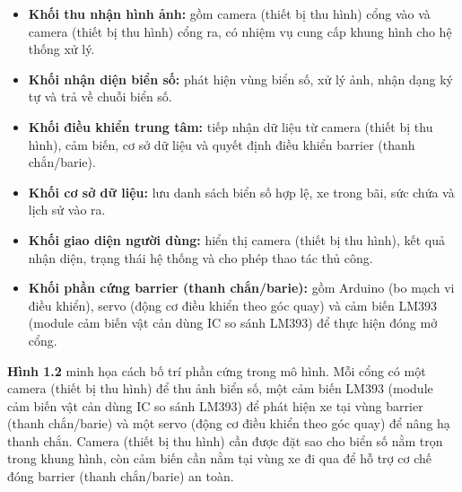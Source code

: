\documentclass[a4paper,14pt]{extreport}
\begin{document}
\begin{itemize}[leftmargin=2em]
  \item \textbf{Khối thu nhận hình ảnh:} gồm camera (thiết bị thu hình) cổng vào và camera (thiết bị thu hình) cổng ra, có nhiệm vụ cung cấp khung hình cho hệ thống xử lý.
  \item \textbf{Khối nhận diện biển số:} phát hiện vùng biển số, xử lý ảnh, nhận dạng ký tự và trả về chuỗi biển số.
  \item \textbf{Khối điều khiển trung tâm:} tiếp nhận dữ liệu từ camera (thiết bị thu hình), cảm biến, cơ sở dữ liệu và quyết định điều khiển barrier (thanh chắn/barie).
  \item \textbf{Khối cơ sở dữ liệu:} lưu danh sách biển số hợp lệ, xe trong bãi, sức chứa và lịch sử vào ra.
  \item \textbf{Khối giao diện người dùng:} hiển thị camera (thiết bị thu hình), kết quả nhận diện, trạng thái hệ thống và cho phép thao tác thủ công.
  \item \textbf{Khối phần cứng barrier (thanh chắn/barie):} gồm Arduino (bo mạch vi điều khiển), servo (động cơ điều khiển theo góc quay) và cảm biến LM393 (module cảm biến vật cản dùng IC so sánh LM393) để thực hiện đóng mở cổng.
\end{itemize}
\textbf{Hình 1.2} minh họa cách bố trí phần cứng trong mô hình. Mỗi cổng có một camera (thiết bị thu hình) để thu ảnh biển số, một cảm biến LM393 (module cảm biến vật cản dùng IC so sánh LM393) để phát hiện xe tại vùng barrier (thanh chắn/barie) và một servo (động cơ điều khiển theo góc quay) để nâng hạ thanh chắn. Camera (thiết bị thu hình) cần được đặt sao cho biển số nằm trọn trong khung hình, còn cảm biến cần nằm tại vùng xe đi qua để hỗ trợ cơ chế đóng barrier (thanh chắn/barie) an toàn.
\end{document}
